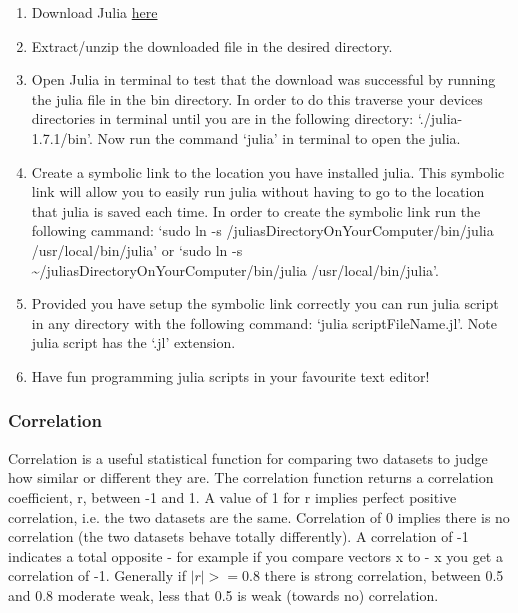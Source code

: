 \begin{enumerate}
    \item Download Julia \href{https://julialang.org/downloads/}{here}
    \item Extract/unzip the downloaded file in the desired directory.
    \item Open Julia in terminal to test that the download was successful by running the julia file in the bin directory. In order to do this traverse your devices directories in terminal until you are in the following directory: `./julia-1.7.1/bin'. Now run the command `julia' in terminal to open the julia.
    \item Create a symbolic link to the location you have installed julia. This symbolic link will allow you to easily run julia without having to go to the location that julia is saved each time. In order to create the symbolic link run the following cammand: \newline `sudo ln -s /juliasDirectoryOnYourComputer/bin/julia /usr/local/bin/julia' \newline or \newline `sudo ln -s \textasciitilde /juliasDirectoryOnYourComputer/bin/julia /usr/local/bin/julia'.
    \item Provided you have setup the symbolic link correctly you can run julia script in any directory with the following command: `julia scriptFileName.jl'. Note julia script has the `.jl' extension.
    \item Have fun programming julia scripts in your favourite text editor!
    
\end{enumerate}

\newpage 
\subsubsection{Correlation}
Correlation is a useful statistical function for comparing two datasets to judge how similar or different they are. The correlation function returns a correlation coefficient, r, between -1 and 1. A value of 1 for r implies perfect positive correlation, i.e. the two datasets are the same. Correlation of 0 implies there is no correlation (the two datasets behave totally differently). A correlation of -1 indicates a total opposite - for example if you compare vectors x to - x you get a correlation of -1. Generally if $|r| >= 0.8$ there is strong correlation, between 0.5 and 0.8 moderate weak, less that 0.5 is weak (towards no) correlation.


